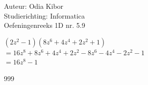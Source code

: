 \documentclass[a4paper]{article}
\begin{document}
  
\noindent \large Auteur: Odia Kibor \\
\noindent \large Studierichting: Informatica\\
\noindent \large Oefeningenreeks 1D nr. 5.9\\

\medskip

\normalsize

$(2z^2 - 1)(8z^6 + 4z^4 + 2z^2 +1)$\\

$= 16z^8 + 8z^6 + 4z^4 + 2z^2 - 8z^6 - 4z^4 - 2z^2 - 1$\\

$= 16z^8 - 1$\\


\begin{thebibliography}{999}
\end{thebibliography}
\end{document}
